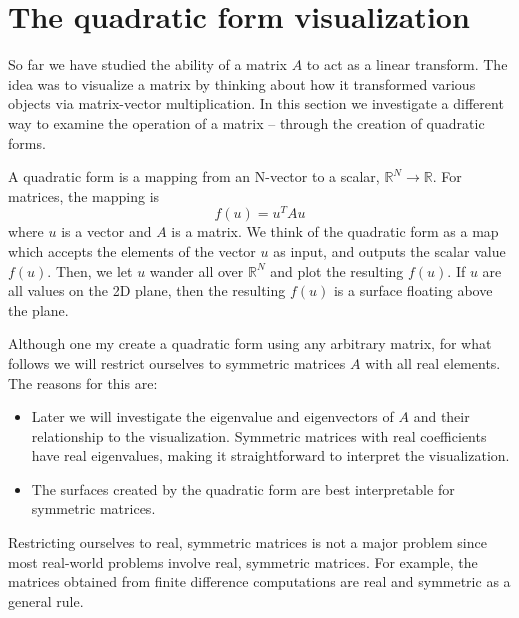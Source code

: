 \documentclass[onefignum,onetabnum]{siamart190516}
\newcommand{\R}{\mathbb{R}}
\begin{document}
\section{The quadratic form visualization} 
So far we have studied the ability of a matrix $A$ to act as a linear
transform.  The idea was to visualize a matrix by thinking about how
it transformed various objects via matrix-vector multiplication.  In
this section we investigate a different way to examine the operation
of a matrix -- through the creation of quadratic forms.

A quadratic form is a mapping from an N-vector to a scalar, $\R^N \to \R$.  
For matrices, the
mapping is
\begin{equation}
\label{eq:quadraticform}
f(u) = u^T A u
\end{equation}
where $u$ is a vector and $A$ is a matrix.  We think of the quadratic
form as a map which accepts the elements of the vector $u$ as input, and
outputs the scalar value $f(u)$.  Then, we let $u$ wander all over
$\R^N$ and plot the resulting $f(u)$.  If $u$ are all values on the 
2D plane, then
the resulting $f(u)$ is a surface floating above the plane.

Although one my create a quadratic form using any arbitrary matrix, for
what follows we will restrict ourselves to symmetric matrices $A$ with
all real elements.  The reasons for this are:
\begin{itemize}
\item Later we will investigate the eigenvalue and eigenvectors of $A$ and
their relationship to the visualization.  Symmetric matrices with
real coefficients have real eigenvalues, making it straightforward
to interpret the visualization.
\item The surfaces created by the quadratic form are best interpretable
for symmetric matrices.
\end{itemize}
Restricting ourselves to real, symmetric matrices is not a major
problem since most real-world problems involve real, symmetric
matrices.  For example, the matrices
obtained from finite difference computations are
real and symmetric as a general rule.
\end{document}
